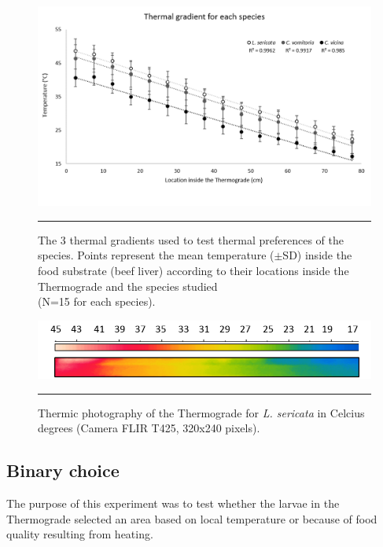 \begin{figure}[ht]
\centering
		\includegraphics[width=1 \textwidth]{Figures/thermograde1.png}
		\rule{35em}{0.5pt}
		\caption[Thermo1]{The 3 thermal gradients used to test thermal preferences of the species. Points represent the mean temperature ($\pm$SD) inside the food substrate (beef liver) according to their locations inside the Thermograde and the species studied \\(N=15 for each species).}
	\label{fig:thermo1}
\end{figure}

\begin{figure}[ht]
\centering
		\includegraphics[width=0.9 \textwidth]{Figures/thermograde2.png}
		\rule{35em}{0.5pt}
		\caption[Thermo2]{Thermic photography of the Thermograde for \textit{L. sericata} in Celcius \\degrees (Camera FLIR T425, 320x240 pixels).}
	\label{fig:thermo2}
\end{figure}    
    
    
    	\subsection{Binary choice} 
The purpose of this experiment was to test whether the larvae in the Thermograde selected an area based on local temperature or because of food quality resulting from heating. 

